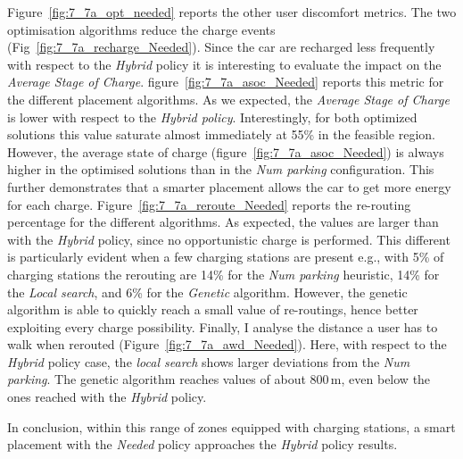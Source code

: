  
Figure~\ref{fig:7_7a_opt_needed} reports the other user discomfort metrics. The two optimisation algorithms reduce the charge events (Fig~\ref{fig:7_7a_recharge_Needed}).
Since the car are recharged less frequently with respect to the \textit{Hybrid} policy it is interesting to evaluate the impact on the \textit{Average Stage of Charge}. figure~\ref{fig:7_7a_asoc_Needed} reports this metric for the different placement algorithms.  As we expected, the \textit{Average Stage of Charge} is lower with respect to the \textit{Hybrid policy}. Interestingly, for both optimized solutions this value saturate almost immediately at 55\% in the feasible region.
However,  the average state of charge (figure~\ref{fig:7_7a_asoc_Needed}) is always higher in the optimised solutions than in the \textit{Num parking} configuration. This further demonstrates that a smarter placement allows the car to get more energy for each charge.
Figure~\ref{fig:7_7a_reroute_Needed} reports the re-routing percentage for the different algorithms. As expected, the values are larger than with the \textit{Hybrid} policy, since no opportunistic charge is performed. 
This different is particularly evident when a few charging stations are present e.g., with 5\% of charging stations the rerouting are 14\% for the \textit{Num parking} heuristic, 14\% for the \textit{Local search}, and 6\% for the \textit{Genetic} algorithm. 
However, the genetic algorithm is able to quickly reach a small value of re-routings, hence better exploiting every charge possibility. 
Finally, I analyse the distance a user has to walk when rerouted (Figure~\ref{fig:7_7a_awd_Needed}). Here, with respect to the \textit{Hybrid} policy case, the \textit{local search} shows larger deviations from the \textit{Num parking}. The genetic algorithm reaches values of about 800\,m, even below the ones reached with the \textit{Hybrid} policy.

In conclusion, within this range of zones equipped with charging stations, a smart placement with the \textit{Needed} policy approaches the \textit{Hybrid} policy results.  



 
 
 
 


